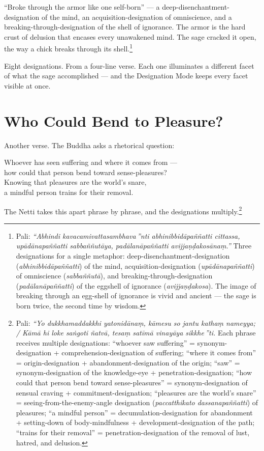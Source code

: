 ``Broke through the armor like one self-born'' --- a deep-disenchantment-designation of the mind, an acquisition-designation of omniscience, and a breaking-through-designation of the shell of ignorance. The armor is the hard crust of delusion that encases every unawakened mind. The sage cracked it open, the way a chick breaks through its shell.\footnote{Pali: \textit{``Abhindi kavacamivattasambhava\,''nti abhinibbidāpaññatti cittassa, upādānapaññatti sabbaññutāya, padālanāpaññatti avijjaṇḍakosānaṃ.''} Three designations for a single metaphor: deep-disenchantment-designation (\textit{abhinibbidāpaññatti}) of the mind, acquisition-designation (\textit{upādānapaññatti}) of omniscience (\textit{sabbaññutā}), and breaking-through-designation (\textit{padālanāpaññatti}) of the eggshell of ignorance (\textit{avijjaṇḍakosa}). The image of breaking through an egg-shell of ignorance is vivid and ancient --- the sage is born twice, the second time by wisdom.}

Eight designations. From a four-line verse. Each one illuminates a different facet of what the sage accomplished --- and the Designation Mode keeps every facet visible at once.

\section*{Who Could Bend to Pleasure?}

Another verse. The Buddha asks a rhetorical question:

\begin{versebox}
Whoever has seen suffering and where it comes from ---\\
how could that person bend toward sense-pleasures?\\
Knowing that pleasures are the world's snare,\\
a mindful person trains for their removal.
\end{versebox}

The Netti takes this apart phrase by phrase, and the designations multiply.\footnote{Pali: \textit{``Yo dukkhamaddakkhi yatonidānaṃ, kāmesu so jantu kathaṃ nameyya; / Kāmā hi loke saṅgoti ñatvā, tesaṃ satīmā vinayāya sikkhe\,''ti.} Each phrase receives multiple designations: ``whoever saw suffering'' = synonym-designation + comprehension-designation of suffering; ``where it comes from'' = origin-designation + abandonment-designation of the origin; ``saw'' = synonym-designation of the knowledge-eye + penetration-designation; ``how could that person bend toward sense-pleasures'' = synonym-designation of sensual craving + commitment-designation; ``pleasures are the world's snare'' = seeing-from-the-enemy-angle designation (\textit{paccatthikato dassanapaññatti}) of pleasures; ``a mindful person'' = decumulation-designation for abandonment + setting-down of body-mindfulness + development-designation of the path; ``trains for their removal'' = penetration-designation of the removal of lust, hatred, and delusion.}

